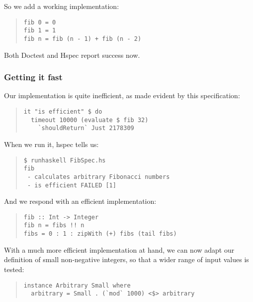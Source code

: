 \documentclass[preprint]{sigplanconf}
\begin{document}
\noindent So we add a working implementation:

\begin{quote}
\small
\begin{verbatim}
fib 0 = 0
fib 1 = 1
fib n = fib (n - 1) + fib (n - 2)
\end{verbatim}
\end{quote}

\noindent Both Doctest and Hspec report success now.


\subsubsection{Getting it fast}

Our implementation is quite inefficient, as made evident by this
specification:

\begin{quote}
\small
\begin{verbatim}
it "is efficient" $ do
  timeout 10000 (evaluate $ fib 32)
    `shouldReturn` Just 2178309
\end{verbatim}
\end{quote}

\noindent When we run it, hspec tells us:

\begin{quote}
\small
\begin{verbatim}
$ runhaskell FibSpec.hs
fib
 - calculates arbitrary Fibonacci numbers
 - is efficient FAILED [1]
\end{verbatim}
\end{quote}

\noindent And we respond with an efficient implementation:

\begin{quote}
\small
\begin{verbatim}
fib :: Int -> Integer
fib n = fibs !! n
fibs = 0 : 1 : zipWith (+) fibs (tail fibs)
\end{verbatim}
\end{quote}

\noindent With a much more efficient implementation at hand, we can
now adapt our definition of small non-negative integers, so that
a wider range of input values is tested:

\begin{quote}
\small
\begin{verbatim}
instance Arbitrary Small where
  arbitrary = Small . (`mod` 1000) <$> arbitrary
\end{verbatim}
\end{quote}
\end{document}
